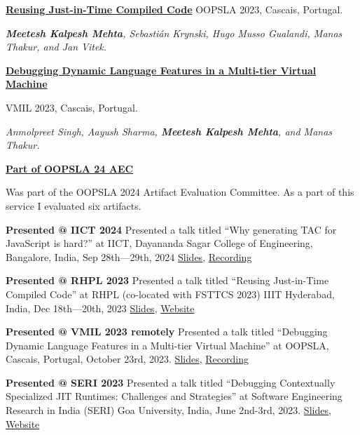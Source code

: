 

\href{https://doi.org/10.1145/3622839}{\textbf{Reusing Just-in-Time Compiled Code}}\newline
OOPSLA 2023, Cascais, Portugal.

{\it {\bf Meetesh Kalpesh Mehta}, Sebastián Krynski, Hugo Musso Gualandi, Manas Thakur, and Jan Vitek.}

\divider

\href{https://doi.org/10.1145/3623507.3623549}{\textbf{Debugging Dynamic Language Features in a Multi-tier Virtual Machine}}\newline

VMIL 2023, Cascais, Portugal.

{\it Anmolpreet Singh, Aayush Sharma, {\bf Meetesh Kalpesh Mehta}, and Manas Thakur.}


\href{https://2024.splashcon.org/profile/meeteshkalpeshmehta}{\textbf{Part of OOPSLA 24 AEC}}\newline

Was part of the OOPSLA 2024 Artifact Evaluation Committee.
As a part of this service I evaluated six artifacts.


\textbf{Presented @ IICT 2024}\newline
Presented a talk titled ``Why generating TAC for JavaScript is hard?'' at IICT, Dayananda Sagar College of Engineering, Bangalore, India, Sep 28th—29th, 2024
\href{https://meetesh06.github.io/IICT-PPT-RC2.pdf}{Slides}, \href{https://www.youtube.com/watch?v=5yYm6mYRiO8}{Recording}

\divider

\textbf{Presented @ RHPL 2023}\newline
Presented a talk titled ``Reusing Just-in-Time Compiled Code'' at RHPL (co-located with FSTTCS 2023) IIIT Hyderabad, India, Dec 18th—20th, 2023
\href{https://meetesh06.github.io/RHPL-23.pdf}{Slides}, \href{https://fmindia.cmi.ac.in/rhpl/index.html}{Website}

\divider

\textbf{Presented @ VMIL 2023 remotely}\newline
Presented a talk titled ``Debugging Dynamic Language Features in a Multi-tier Virtual Machine'' at OOPSLA, Cascais, Portugal, October 23rd, 2023.
\href{https://meetesh06.github.io/VMIL-23-talk.pdf}{Slides}, \href{https://www.youtube.com/watch?v=pd_Px8LaHvw&t=20041s}{Recording}

\divider

\textbf{Presented @ SERI 2023}\newline
Presented a talk titled ``Debugging Contextually Specialized JIT Runtimes: Challenges and Strategies'' at Software Engineering Research in India (SERI) Goa University, India, June 2nd-3rd, 2023.
\href{https://meetesh06.github.io/seri-23-talk.pdf}{Slides}, \href{https://sites.google.com/view/seri-2023-goa/talks?authuser=0}{Website}
